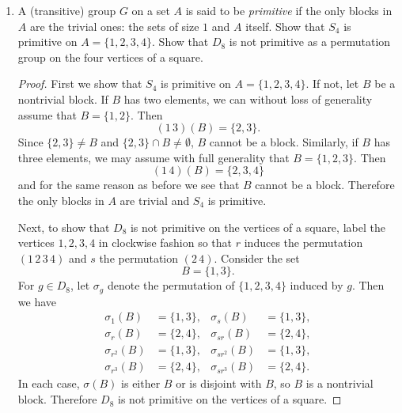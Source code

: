 \begin{enumerate}
\begin{proof}
    Each $\sigma_i(B)$ is nonempty, they are pairwise disjoint, and
    their union is $A$. Therefore these sets form a partition of $A$.
  \end{proof}

\item A (transitive) group $G$ on a set $A$ is said to be {\em
    primitive} if the only blocks in $A$ are the trivial ones: the
  sets of size $1$ and $A$ itself. Show that $S_4$ is primitive on
  $A = \{1,2,3,4\}$. Show that $D_8$ is not primitive as a permutation
  group on the four vertices of a square.
  \begin{proof}
    First we show that $S_4$ is primitive on $A = \{1,2,3,4\}$. If
    not, let $B$ be a nontrivial block. If $B$ has two elements, we
    can without loss of generality assume that $B = \{1,2\}$. Then
    \begin{equation*}
      (1\,3)(B) = \{2,3\}.
    \end{equation*}
    Since $\{2,3\}\neq B$ and $\{2,3\}\cap B\neq\emptyset$, $B$ cannot
    be a block. Similarly, if $B$ has three elements, we may assume
    with full generality that $B = \{1,2,3\}$. Then
    \begin{equation*}
      (1\,4)(B) = \{2,3,4\}
    \end{equation*}
    and for the same reason as before we see that $B$ cannot be a
    block. Therefore the only blocks in $A$ are trivial and $S_4$ is
    primitive.

    Next, to show that $D_8$ is not primitive on the vertices of a
    square, label the vertices $1,2,3,4$ in clockwise fashion so that
    $r$ induces the permutation $(1\,2\,3\,4)$ and $s$ the permutation
    $(2\,4)$. Consider the set
    \begin{equation*}
      B = \{1,3\}.
    \end{equation*}
    For $g\in D_8$, let $\sigma_g$ denote the permutation of
    $\{1,2,3,4\}$ induced by $g$. Then we have
    \begin{align*}
      \sigma_1(B) &= \{1,3\}, & \sigma_s(B) &= \{1,3\}, \\
      \sigma_r(B) &= \{2,4\}, & \sigma_{sr}(B) &= \{2,4\}, \\
      \sigma_{r^2}(B) &= \{1,3\}, & \sigma_{sr^2}(B) &= \{1,3\}, \\
      \sigma_{r^3}(B) &= \{2,4\}, & \sigma_{sr^3}(B) &= \{2,4\}.
    \end{align*}
    In each case, $\sigma(B)$ is either $B$ or is disjoint with $B$,
    so $B$ is a nontrivial block. Therefore $D_8$ is not primitive on
    the vertices of a square.
  \end{proof}


\end{enumerate}
